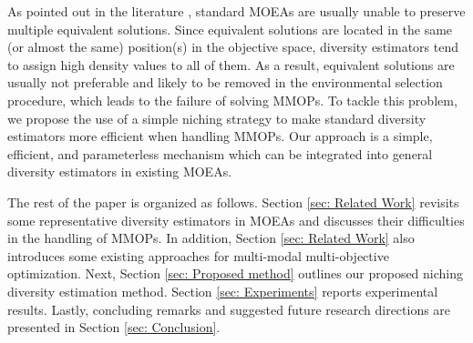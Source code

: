 As pointed out in the literature \cite{MOEAD_AD}, standard MOEAs are usually unable to preserve multiple equivalent solutions. Since equivalent solutions are located in the same (or almost the same) position(s) in the objective space, diversity estimators tend to assign high density values to all of them. As a result, equivalent solutions are usually not preferable and likely to be removed in the environmental selection procedure, which leads to the failure of solving MMOPs. To tackle this problem, we propose the use of a simple niching strategy to make standard diversity estimators more eﬃcient when handling MMOPs. Our approach is a simple, efficient, and parameterless mechanism which can be integrated into general diversity estimators in existing MOEAs.

The rest of the paper is organized as follows. Section \ref{sec: Related Work} revisits some representative diversity estimators in MOEAs and discusses their difficulties in the handling of MMOPs. In addition, Section \ref{sec: Related Work} also introduces some existing approaches for multi-modal multi-objective optimization. Next, Section \ref{sec: Proposed method} outlines our proposed niching diversity estimation method. Section \ref{sec: Experiments} reports experimental results. Lastly, concluding remarks and suggested future research directions are presented in Section \ref{sec: Conclusion}.